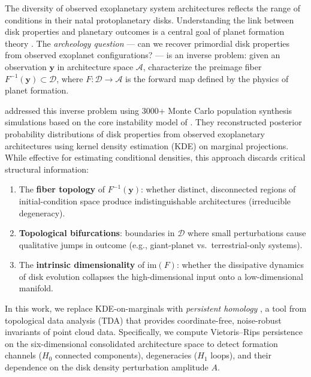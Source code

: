 \documentclass[twocolumn]{aastex631}
\begin{document}
The diversity of observed exoplanetary system architectures reflects the range
of conditions in their natal protoplanetary disks.  Understanding the link
between disk properties and planetary outcomes is a central goal of planet
formation theory \citep{Benz2014}.  The \emph{archeology question} --- can we
recover primordial disk properties from observed exoplanet configurations? ---
is an inverse problem: given an observation $\mathbf{y}$ in architecture space
$\mathcal{A}$, characterize the preimage fiber
$F^{-1}(\mathbf{y}) \subset \mathcal{D}$, where $F: \mathcal{D} \to
\mathcal{A}$ is the forward map defined by the physics of planet formation.

\citet{Chaparro2019} addressed this inverse problem using 3000+ Monte Carlo
population synthesis simulations based on the core instability model of
\citet{Miguel2011}.  They reconstructed posterior probability distributions of
disk properties from observed exoplanetary architectures using
kernel density estimation (KDE) on marginal projections.  While effective for
estimating conditional densities, this approach discards critical structural
information:

\begin{enumerate}
\item The \textbf{fiber topology} of $F^{-1}(\mathbf{y})$: whether distinct,
disconnected regions of initial-condition space produce indistinguishable
architectures (irreducible degeneracy).

\item \textbf{Topological bifurcations}: boundaries in $\mathcal{D}$ where
small perturbations cause qualitative jumps in outcome (e.g., giant-planet
vs.\ terrestrial-only systems).

\item The \textbf{intrinsic dimensionality} of $\mathrm{im}(F)$: whether the
dissipative dynamics of disk evolution collapses the high-dimensional input
onto a low-dimensional manifold.
\end{enumerate}

In this work, we replace KDE-on-marginals with \emph{persistent homology}
\citep{Carlsson2009, EdelsbrunnerHarer2010}, a tool from topological data
analysis (TDA) that provides coordinate-free, noise-robust invariants of point
cloud data.  Specifically, we compute Vietoris--Rips persistence on the
six-dimensional consolidated architecture space to detect formation channels
($H_0$ connected components), degeneracies ($H_1$ loops), and their dependence
on the disk density perturbation amplitude $A$.
\end{document}
